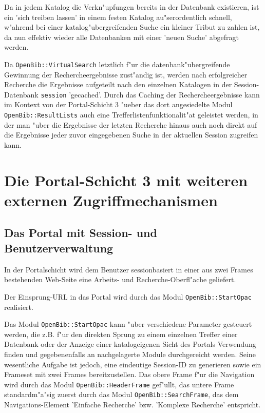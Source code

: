 \documentclass[11pt, twoside, a4paper, BCOR8mm, DIV12, bibtotoc,idxtotoc]{scrbook}
\begin{document}
\begin{itemize}
Da in jedem Katalog die Verkn"upfungen bereits in der Datenbank
existieren, ist ein 'sich treiben lassen' in einem festen Katalog
au"ser\-ordentlich schnell, w"ahrend bei einer katalog"ubergreifenden
Suche ein kleiner Tribut zu zahlen ist, da nun effektiv wieder alle
Datenbanken mit einer 'neuen Suche' abgefragt werden.

Da \texttt{OpenBib::VirtualSearch} letztlich f"ur die
datenbank"ubergreifende Gewinnung der Recherche\-er\-geb\-nisse
zust"andig ist, werden nach erfolgreicher Recherche die Ergebnisse
aufgeteilt nach den einzelnen Katalogen in der Session-Datenbank
\texttt{session} 'gecached'. Durch das Caching der
Re\-cher\-che\-ergebnisse kann im Kontext von der Portal-Schicht 3
"ueber das dort angesiedelte Modul \texttt{OpenBib::ResultLists} auch
eine Trefferlistenfunktionalit"at geleistet werden, in der man "uber
die Ergebnisse der letzten Recherche hinaus auch noch direkt auf die
Ergebnisse jeder zuvor eingegebenen Suche in der aktuellen Session
zugreifen kann.

\section{Die Portal-Schicht 3 mit weiteren externen Zugriffmechanismen}

\subsection{Das Portal mit Session- und Benutzerverwaltung}

In der Portalschicht wird dem Benutzer sessionbasiert in einer aus
zwei Frames bestehenden Web-Seite eine Arbeits- und Recherche-Oberfl"ache
geliefert. 

Der Einsprung-URL in das Portal wird durch das Modul
\texttt{OpenBib::StartOpac} realisiert.

Das Modul \texttt{OpenBib::StartOpac} kann "uber verschiedene
Parameter gesteuert werden, die z.B. f"ur den direkten Sprung zu einem
einzelnen Treffer einer Datenbank oder der Anzeige einer
katalogeigenen Sicht des Portals Verwendung finden und gegebenenfalls
an nachgelagerte Module durchgereicht werden. Seine wesentliche
Aufgabe ist jedoch, eine eindeutige Session-ID zu generieren sowie ein
Frameset mit zwei Frames bereitzustellen.  Das obere Frame f"ur die
Navigation wird durch das Modul \texttt{OpenBib::HeaderFrame}
gef"ullt, das untere Frame standardm"a"sig zuerst durch das Modul
\texttt{OpenBib::SearchFrame}, das dem Navigations-Element 'Einfache
Recherche' bzw. 'Komplexe Recherche' entspricht.


\end{itemize}
\end{document}
